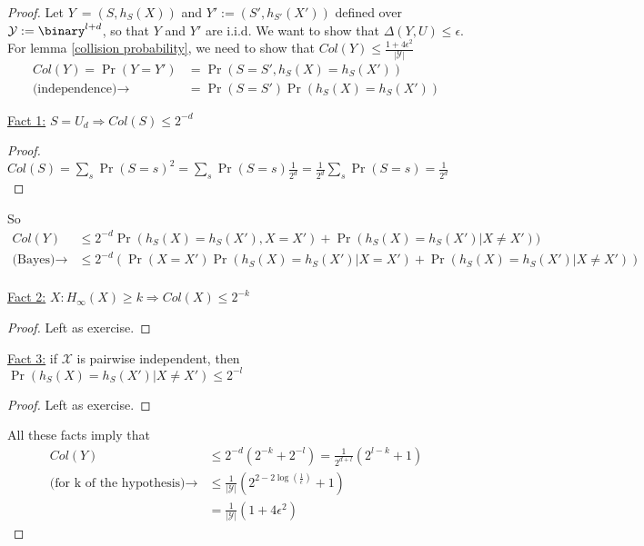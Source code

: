 \begin{proof}
    Let $Y\:= (S, h_S(X))$ and $Y':= (S', h_{S'}(X'))$ defined over $\mathcal{Y}:= \binary^{l+d}$, so that $Y$ and $Y'$ are i.i.d.
    We want to show that $\Delta(Y, U) \leq \epsilon$. For lemma \ref{collision probability}, we need to show that $Col(Y) \leq \frac{1 + 4\epsilon^2}{|\mathcal{Y}|}$
    \begin{align*}
        Col(Y) = \Pr(Y=Y')                & = \Pr(S=S', h_S(X) = h_S(X'))       \\
        \mbox{(independence)} \rightarrow & = \Pr(S = S') \Pr(h_S(X) = h_S(X'))
    \end{align*}

    \underline{Fact 1:} $S= U_d \Rightarrow Col(S) \leq 2^{-d}$

    \begin{proof}
        $Col(S) = \sum_s \Pr(S=s)^2 = \sum_s \Pr(S=s)\frac{1}{2^d} = \frac{1}{2^d}\sum_s \Pr(S=s) = \frac{1}{2^d}$
    \end{proof}

    So
    \begin{align*}
        Col(Y)                     & \leq 2^{-d} \Pr(h_S(X) = h_S(X'), X = X') + \Pr(h_S(X) = h_S(X') | X \neq X'))               \\
        \mbox{(Bayes)} \rightarrow & \leq 2^{-d} (\Pr(X = X') \Pr(h_S(X) = h_S(X') | X = X') + \Pr(h_S(X) = h_S(X') | X \neq X')) \\
    \end{align*}

    \underline{Fact 2:} $X: H_\infty(X) \geq k \Rightarrow Col(X) \leq 2^{-k}$

    \begin{proof}
        Left as exercise.
    \end{proof}

    \underline{Fact 3:} if $\mathcal{X}$ is pairwise independent, then  $\Pr(h_S(X) = h_S(X') | X \neq X') \leq 2^{-l}$

    \begin{proof}
        Left as exercise.
    \end{proof}

    All these facts imply that
    \begin{align*}
        Col(Y)                                       & \leq 2^{-d}(2^{-k} + 2^{-l}) = \frac{1}{2^{d+l}}(2^{l-k} + 1)        \\
        \mbox{(for k of the hypothesis)} \rightarrow & \leq \frac{1}{|\mathcal{Y}|}(2^{2 - 2 \log(\frac{1}{\epsilon})} + 1) \\
                                                     & = \frac{1}{|\mathcal{Y}|} (1 + 4\epsilon^2)
    \end{align*}
\end{proof}

